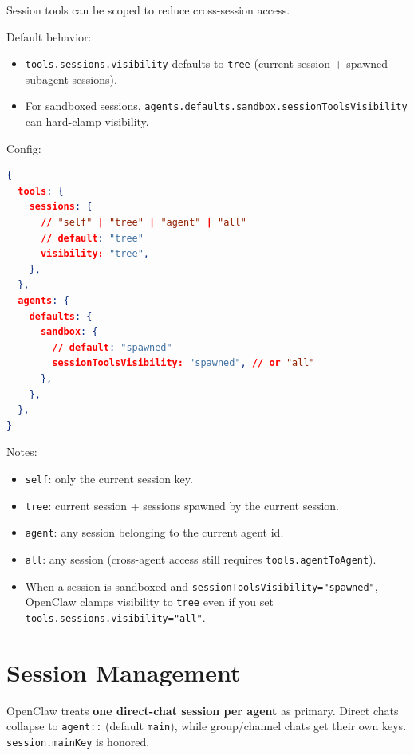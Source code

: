 Session tools can be scoped to reduce cross-session access.

Default behavior:

\begin{itemize}
  \item \texttt{tools.sessions.visibility} defaults to \texttt{tree} (current session + spawned subagent sessions).
  \item For sandboxed sessions, \texttt{agents.defaults.sandbox.sessionToolsVisibility} can hard-clamp visibility.
\end{itemize}


Config:

\begin{lstlisting}[language=json]
{
  tools: {
    sessions: {
      // "self" | "tree" | "agent" | "all"
      // default: "tree"
      visibility: "tree",
    },
  },
  agents: {
    defaults: {
      sandbox: {
        // default: "spawned"
        sessionToolsVisibility: "spawned", // or "all"
      },
    },
  },
}
\end{lstlisting}


Notes:

\begin{itemize}
  \item \texttt{self}: only the current session key.
  \item \texttt{tree}: current session + sessions spawned by the current session.
  \item \texttt{agent}: any session belonging to the current agent id.
  \item \texttt{all}: any session (cross-agent access still requires \texttt{tools.agentToAgent}).
  \item When a session is sandboxed and \texttt{sessionToolsVisibility="spawned"}, OpenClaw clamps visibility to \texttt{tree} even if you set \texttt{tools.sessions.visibility="all"}.
\end{itemize}



\clearpage

\section{Session Management}


OpenClaw treats \textbf{one direct-chat session per agent} as primary. Direct chats collapse to \texttt{agent::} (default \texttt{main}), while group/channel chats get their own keys. \texttt{session.mainKey} is honored.

